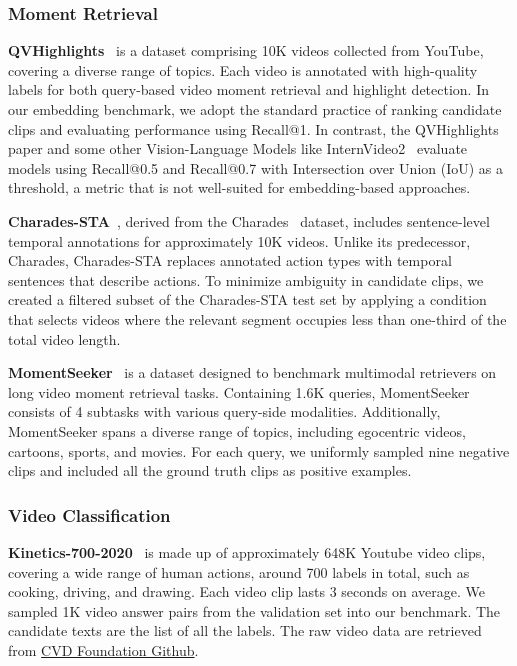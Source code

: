 \subsubsection{Moment Retrieval}
\textbf{QVHighlights}~\citep{qvhighlights} is a dataset comprising 10K videos collected from YouTube, covering a diverse range of topics. Each video is annotated with high-quality labels for both query-based video moment retrieval and highlight detection. In our embedding benchmark, we adopt the standard practice of ranking candidate clips and evaluating performance using Recall@1. In contrast, the QVHighlights paper and some other Vision-Language Models like InternVideo2~\citep{internvideo2} evaluate models using Recall@0.5 and Recall@0.7 with Intersection over Union (IoU) as a threshold, a metric that is not well-suited for embedding-based approaches.

\textbf{Charades-STA}~\citep{charadessta}, derived from the Charades~\citep{sigurdsson2016hollywood} dataset, includes sentence-level temporal annotations for approximately 10K videos. Unlike its predecessor, Charades, Charades-STA replaces annotated action types with temporal sentences that describe actions. To minimize ambiguity in candidate clips, we created a filtered subset of the Charades-STA test set by applying a condition that selects videos where the relevant segment occupies less than one-third of the total video length.

\textbf{MomentSeeker}~\citep{momentseeker} is a dataset designed to benchmark multimodal retrievers on long video moment retrieval tasks. Containing 1.6K queries, MomentSeeker consists of 4 subtasks with various query-side modalities. Additionally, MomentSeeker spans a diverse range of topics, including egocentric videos, cartoons, sports, and movies. For each query, we uniformly sampled nine negative clips and included all the ground truth clips as positive examples.

\subsubsection{Video Classification}
\textbf{Kinetics-700-2020}~\citep{kinetics700} is made up of approximately 648K Youtube video clips, covering a wide range of human actions, around 700 labels in total, such as cooking, driving, and drawing. Each video clip lasts 3 seconds on average. We sampled 1K video answer pairs from the validation set into our benchmark. The candidate texts are the list of all the labels. The raw video data are retrieved from \href{https://github.com/cvdfoundation/kinetics-dataset?tab=readme-ov-file}{CVD Foundation Github}.

